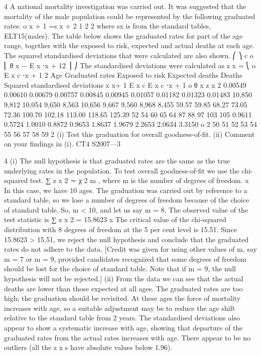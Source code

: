 4
A national mortality investigation was carried out. It was suggested that the mortality of the male population could be represented by the following graduated rates:
o
\mu x + 1 =\mu s x + 2 1
2
2
where \mu sx is from the standard tables, ELT15(males).
The table below shows the graduated rates for part of the age range, together with the exposed to risk, expected and actual deaths at each age. The squared standardised
deviations that were calculated are also shown.
⎛
⎞
c o
⎜ θ x − E x ⋅\mu x + 12 ⎟
⎠
The standardised deviations were calculated as z x = ⎝
o
E x c ⋅\mu x + 1
2
Age Graduated
rates
Exposed
to risk Expected
deaths Deaths Squared
standardised
deviations
x \mu x+ 1 E x c E x c ⋅\mu x + 1 o θ x z x 2
0.00549
0.00610
0.00679
0.00757
0.00845
0.00945
0.01057
0.01182
0.01323
0.01483 10,850
9,812
10,054
9,650
8,563
10,656
9,667
9,560
8,968
8,455 59.57
59.85
68.27
73.05
72.36
100.70
102.18
113.00
118.65
125.39 52
54
60
65
64
87
88
97
103
105 0.9611
0.5724
1.0010
0.8872
0.9653
1.8637
1.9679
2.2653
2.0634
3.3150
o
2
50
51
52
53
54
55
56
57
58
59
2
(i) Test this graduation for overall goodness-of-fit.
(ii) Comment on your findings in (i).
CT4 S2007—3


4
(i)
The null hypothesis is that graduated rates are the same as the true underlying
rates in the population.
To test overall goodness-of-fit we use the chi-squared test.
∑ z x 2 ∼ χ 2 m , where m is the number of degrees of freedom.
x
In this case, we have 10 ages.
The graduation was carried out by reference to a standard table, so we lose a number of degrees of freedom because of the choice of standard table.
So, m < 10, and let us say m = 8.
The observed value of the test statistic is
∑ z x 2 = 15.8623
x
The critical value of the chi-squared distribution with 8 degrees of freedom at the 5 per cent level is 15.51.
Since 15.8623 > 15.51,
we reject the null hypothesis and conclude that the graduated rates do not
adhere to the data.
[Credit was given for using other values of m, say m = 7 or m = 9, provided candidates recognized that some degrees of freedom should be lost for the choice of standard table. Note that if m = 9, the null hypothesis will not be rejected.]
(ii)
From the data we can see that the actual deaths are lower than those expected at all ages.
The graduated rates are too high; the graduation should be revisited.
At these ages the force of mortality increases with age, so a suitable adjustment may be to reduce the age shift relative to the
standard table from 2 years.
The standardised deviations also appear to show a systematic increase with age, showing that departure of the graduated rates from the actual rates increases with age.
There appear to be no outliers (all the z x s have absolute values below 1.96).

